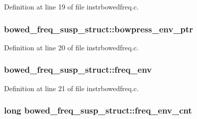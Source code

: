 Definition at line 19 of file instrbowedfreq.\+c.

\subsubsection[{\texorpdfstring{bowpress\+\_\+env\+\_\+ptr}{bowpress_env_ptr}}]{ bowed\+\_\+freq\+\_\+susp\+\_\+struct\+::bowpress\+\_\+env\+\_\+ptr}\hypertarget{structbowed__freq__susp__struct_aef983ae9a5524d3f67f5cd2d7e86832f}{}\label{structbowed__freq__susp__struct_aef983ae9a5524d3f67f5cd2d7e86832f}


Definition at line 20 of file instrbowedfreq.\+c.

\subsubsection[{\texorpdfstring{freq\+\_\+env}{freq_env}}]{ bowed\+\_\+freq\+\_\+susp\+\_\+struct\+::freq\+\_\+env}\hypertarget{structbowed__freq__susp__struct_a0b4d95711bffede12d3a9b6789eed9ab}{}\label{structbowed__freq__susp__struct_a0b4d95711bffede12d3a9b6789eed9ab}


Definition at line 21 of file instrbowedfreq.\+c.

\subsubsection[{\texorpdfstring{freq\+\_\+env\+\_\+cnt}{freq_env_cnt}}]{\setlength{\rightskip}{0pt plus 5cm}long bowed\+\_\+freq\+\_\+susp\+\_\+struct\+::freq\+\_\+env\+\_\+cnt}\hypertarget{structbowed__freq__susp__struct_af1b956713236aac21a5ca30966f6118e}{}\label{structbowed__freq__susp__struct_af1b956713236aac21a5ca30966f6118e}


